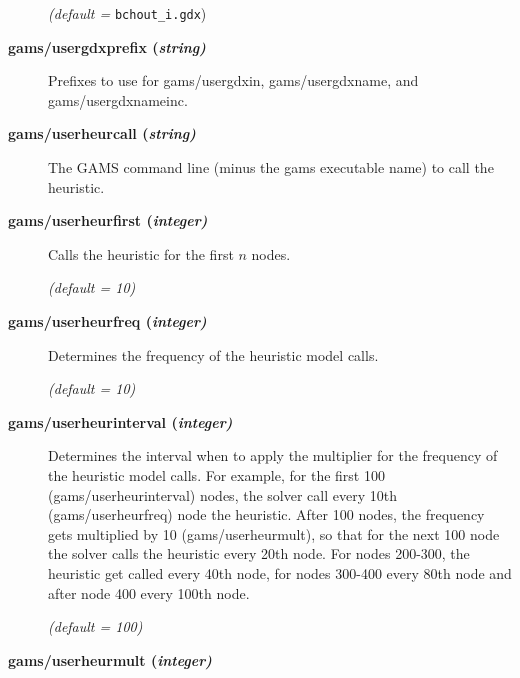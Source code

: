 \begin{description}
\textsl{(default =} \verb=bchout_i.gdx=)

\item[\label{scipusergdxprefix}\hypertarget{scipusergdxprefix}
{\textbf{gams/usergdxprefix (\slshape{string})}}]\hspace{1.0in}

Prefixes to use for gams/usergdxin, gams/usergdxname, and gams/usergdxnameinc.


\item[\label{scipuserheurcall}\hypertarget{scipuserheurcall}
{\textbf{gams/userheurcall (\slshape{string})}}]\hspace{1.0in}

The GAMS command line (minus the gams executable name) to call the heuristic.


\item[\label{scipuserheurfirst}\hypertarget{scipuserheurfirst}
{\textbf{gams/userheurfirst (\slshape{integer})}}]\hspace{1.0in}

Calls the heuristic for the first $n$ nodes.

\textsl{(default = 10)}

\item[\label{scipuserheurfreq}\hypertarget{scipuserheurfreq}
{\textbf{gams/userheurfreq (\slshape{integer})}}]\hspace{1.0in}

Determines the frequency of the heuristic model calls.

\textsl{(default = 10)}

\item[\label{scipuserheurinterval}\hypertarget{scipuserheurinterval}
{\textbf{gams/userheurinterval (\slshape{integer})}}]\hspace{1.0in}

Determines the interval when to apply the multiplier for the frequency of the heuristic model calls.
For example, for the first 100 (gams/userheurinterval) nodes, the solver call every 10th (gams/userheurfreq) node the heuristic.
After 100 nodes, the frequency gets multiplied by 10 (gams/userheurmult), so that for the next 100 node the solver calls the heuristic every 20th node.
For nodes 200-300, the heuristic get called every 40th node, for nodes 300-400 every 80th node and after node 400 every 100th node.

\textsl{(default = 100)}

\item[\label{scipuserheurmult}\hypertarget{scipuserheurmult}
{\textbf{gams/userheurmult (\slshape{integer})}}]\hspace{1.0in}


\end{description}
